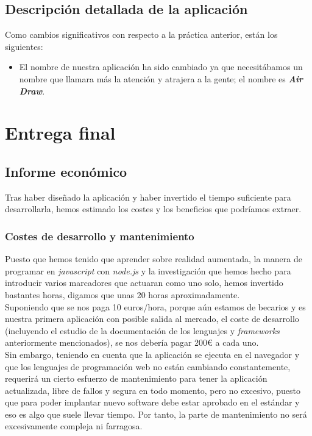 \documentclass[12pt,a4paper]{article}
\begin{document}
\subsection{Descripción detallada de la aplicación}

Como cambios significativos con respecto a la práctica anterior, están los siguientes:

\begin{itemize}
    \item El nombre de nuestra aplicación ha sido cambiado ya que necesitábamos un nombre que llamara más la atención y atrajera a la gente; el nombre es \textit{\textbf{Air Draw}}.
\end{itemize}

\newpage

\section{Entrega final}
\subsection{Informe económico}

Tras haber diseñado la aplicación y haber invertido el tiempo suficiente para desarrollarla, hemos estimado los costes y los beneficios que podríamos extraer.

\subsubsection{Costes de desarrollo y mantenimiento}

Puesto que hemos tenido que aprender sobre realidad aumentada, la manera de programar en \textit{javascript} con \textit{node.js} y la investigación que hemos hecho para introducir varios marcadores que actuaran como uno solo, hemos invertido bastantes horas, digamos que unas 20 horas aproximadamente.\\

Suponiendo que se nos paga 10 euros/hora, porque aún estamos de becarios y es nuestra primera aplicación con posible salida al mercado, el coste de desarrollo (incluyendo el estudio de la documentación de los lenguajes y \textit{frameworks} anteriormente mencionados), se nos debería pagar 200€ a cada uno.\\

Sin embargo, teniendo en cuenta que la aplicación se ejecuta en el navegador y que los lenguajes de programación web no están cambiando constantemente, requerirá un cierto esfuerzo de mantenimiento para tener la aplicación actualizada, libre de fallos y segura en todo momento, pero no excesivo, puesto que para poder implantar nuevo software debe estar aprobado en el estándar y eso es algo que suele llevar tiempo. Por tanto, la parte de mantenimiento no será excesivamente compleja ni farragosa.
\end{document}
